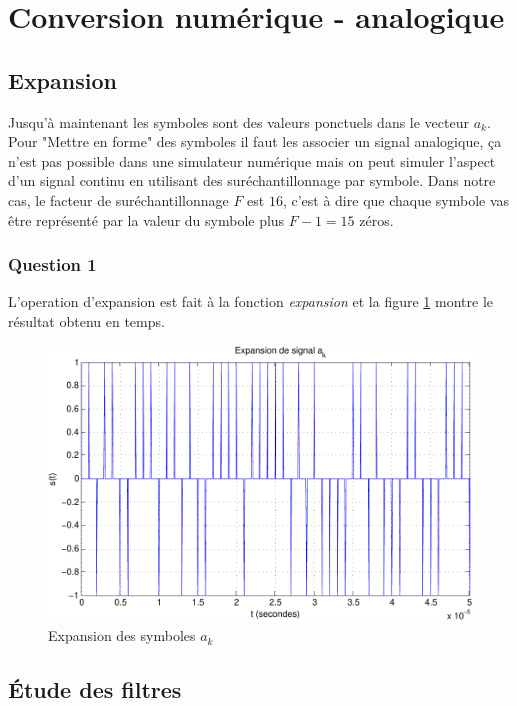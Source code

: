 \documentclass[a4paper,11pt]{article}
\begin{document}
\section{Conversion numérique - analogique}

\subsection{Expansion}
Jusqu'à maintenant les symboles sont des valeurs ponctuels dans le vecteur $a_k$. Pour "Mettre en forme" des symboles il faut les associer un signal analogique, ça n'est pas possible dans une simulateur numérique mais on peut simuler l'aspect d'un signal continu en utilisant des suréchantillonnage par symbole. Dans notre cas, le facteur de suréchantillonnage $F$ est $16$, c'est à dire que chaque symbole vas être représenté par la valeur du symbole plus $F-1=15$ zéros.

\subsubsection*{Question 1}
L'operation d'expansion est fait à la fonction \emph{expansion} et la figure \ref{fig:ques1} montre le résultat obtenu  en temps.

\begin{figure}
	\begin{center}
	\includegraphics[scale=1]{expansion-crop.pdf}
	\caption{Expansion des symboles $a_k$}
	\label{fig:ques1}
	\end{center}
\end{figure} 

\subsection{Étude des filtres}
\end{document}
